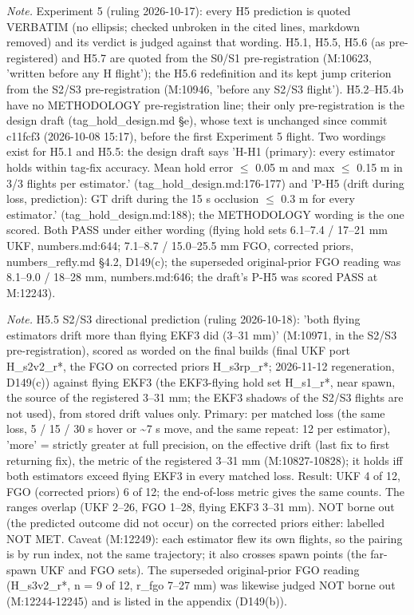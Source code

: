 \begin{table}[htbp]
\textit{Note.} Experiment 5 (ruling 2026-10-17): every H5 prediction is quoted VERBATIM (no ellipsis; checked unbroken in the cited lines, markdown removed) and its verdict is judged against that wording. H5.1, H5.5, H5.6 (as pre-registered) and H5.7 are quoted from the S0/S1 pre-registration (M:10623, 'written before any H flight'); the H5.6 redefinition and its kept jump criterion from the S2/S3 pre-registration (M:10946, 'before any S2/S3 flight'). H5.2--H5.4b have no METHODOLOGY pre-registration line; their only pre-registration is the design draft (tag\_hold\_design.md \S{}e), whose text is unchanged since commit c11fcf3 (2026-10-08 15:17), before the first Experiment 5 flight. Two wordings exist for H5.1 and H5.5: the design draft says 'H-H1 (primary): every estimator holds within tag-fix accuracy. Mean hold error $\le$ 0.05 m and max $\le$ 0.15 m in 3/3 flights per estimator.' (tag\_hold\_design.md:176-177) and 'P-H5 (drift during loss, prediction): GT drift during the 15 s occlusion $\le$ 0.3 m for every estimator.' (tag\_hold\_design.md:188); the METHODOLOGY wording is the one scored. Both PASS under either wording (flying hold sets 6.1--7.4 / 17--21 mm UKF, numbers.md:644; 7.1--8.7 / 15.0--25.5 mm FGO, corrected priors, numbers\_refly.md \S{}4.2, D149(c); the superseded original-prior FGO reading was 8.1--9.0 / 18--28 mm, numbers.md:646; the draft's P-H5 was scored PASS at M:12243).\par
\textit{Note.} H5.5 S2/S3 directional prediction (ruling 2026-10-18): 'both flying estimators drift more than flying EKF3 did (3--31 mm)' (M:10971, in the S2/S3 pre-registration), scored as worded on the final builds (final UKF port H\_s2v2\_r*, the FGO on corrected priors H\_s3rp\_r*; 2026-11-12 regeneration, D149(c)) against flying EKF3 (the EKF3-flying hold set H\_s1\_r*, near spawn, the source of the registered 3--31 mm; the EKF3 shadows of the S2/S3 flights are not used), from stored drift values only. Primary: per matched loss (the same loss, 5 / 15 / 30 s hover or \textasciitilde{}7 s move, and the same repeat: 12 per estimator), 'more' = strictly greater at full precision, on the effective drift (last fix to first returning fix), the metric of the registered 3--31 mm (M:10827-10828); it holds iff both estimators exceed flying EKF3 in every matched loss. Result: UKF 4 of 12, FGO (corrected priors) 6 of 12; the end-of-loss metric gives the same counts. The ranges overlap (UKF 2--26, FGO 1--28, flying EKF3 3--31 mm). NOT borne out (the predicted outcome did not occur) on the corrected priors either: labelled NOT MET. Caveat (M:12249): each estimator flew its own flights, so the pairing is by run index, not the same trajectory; it also crosses spawn points (the far-spawn UKF and FGO sets). The superseded original-prior FGO reading (H\_s3v2\_r*, n = 9 of 12, r\_fgo 7--27 mm) was likewise judged NOT borne out (M:12244-12245) and is listed in the appendix (D149(b)).\par

\end{table}

